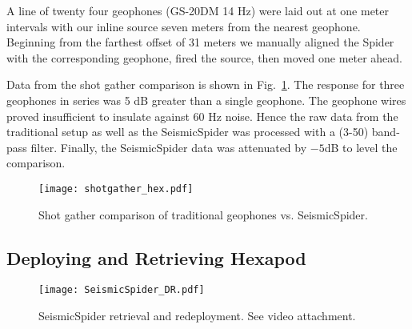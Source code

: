 A line of twenty four geophones (GS-20DM 14 Hz) were laid out at one meter intervals with our inline source seven meters from the nearest geophone. Beginning from the farthest offset of 31 meters we manually aligned the Spider with the corresponding geophone, fired the source, then moved one meter ahead. 

Data from the shot gather comparison is shown in Fig.~\ref{fig:shotgatherHexpod}.
The response for three geophones in series was 5 dB greater than a single geophone. The geophone wires proved insufficient to insulate against 60 Hz noise. Hence the raw data from the traditional setup as well as the SeismicSpider was processed with a (3-50) band-pass filter. Finally, the SeismicSpider data was attenuated by $-5$dB to level the comparison.    

\begin{figure} \centering
  \texttt{[image: shotgather\_hex.pdf]}
 \caption{Shot gather comparison of traditional geophones vs. SeismicSpider. 
 \label{fig:shotgatherHexpod}}
\end{figure}



\subsection{Deploying and Retrieving Hexapod}

\begin{figure} \centering
  \texttt{[image: SeismicSpider\_DR.pdf]}
 \caption{SeismicSpider retrieval and redeployment. See video attachment. 
 \label{fig:SeismicSpiderDR}}
\end{figure}

